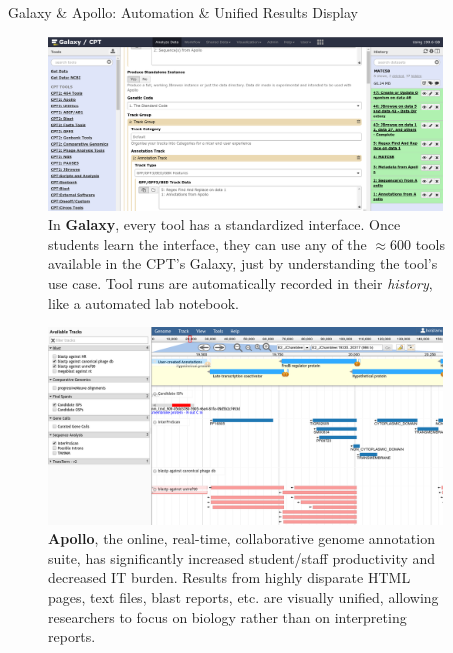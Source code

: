 \documentclass[final,t,20pt]{beamer}
\begin{document}
\begin{frame}[fragile]
\begin{columns}[t]
\begin{column}{.36\linewidth}
        \end{column}
        \begin{column}{.60\linewidth}
            \begin{block}{Galaxy \& Apollo: Automation \& Unified Results Display }
                \begin{figure}
                    \includegraphics[width=0.98\textwidth]{./media/galaxy.png}
                    \caption{In \textbf{Galaxy}, every tool has a standardized
                        interface. Once students learn the interface, they can
                        use any of the $\approx$600 tools available in the
                        CPT's Galaxy, just by understanding the tool's use
                        case. Tool runs are automatically recorded in their
                        \emph{history}, like a automated lab notebook.}
                \end{figure}
                \begin{figure}
                    \includegraphics[width=0.98\textwidth]{./media/apollo.png}
                    \caption{\textbf{Apollo}, the online, real-time,
                    collaborative genome annotation suite, has significantly
                    increased student/staff productivity and
                    decreased IT burden. Results from highly disparate HTML
                    pages, text files, blast reports, etc. are visually
                    unified, allowing researchers to focus on biology rather
                    than on interpreting reports.}
                \end{figure}


\end{block}
\end{column}
\end{columns}
\end{frame}
\end{document}
